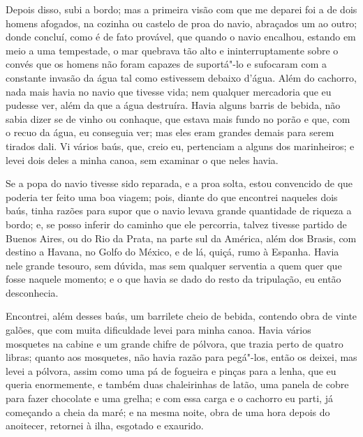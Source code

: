Depois disso, subi a bordo; mas a primeira visão com que me deparei foi
a de dois homens afogados, na cozinha ou castelo de proa do navio,
abraçados um ao outro; donde concluí, como é de fato provável, que
quando o navio encalhou, estando em meio a uma tempestade, o mar
quebrava tão alto e ininterruptamente sobre o convés que os homens não
foram capazes de suportá"-lo e sufocaram com a constante invasão da água
tal como estivessem debaixo d'água. Além do cachorro, nada mais havia no
navio que tivesse vida; nem qualquer mercadoria que eu pudesse ver, além
da que a água destruíra. Havia alguns barris de bebida, não sabia dizer
se de vinho ou conhaque, que estava mais fundo no porão e que, com o
recuo da água, eu conseguia ver; mas eles eram grandes demais para serem
tirados dali. Vi vários baús, que, creio eu, pertenciam a alguns dos
marinheiros; e levei dois deles a minha canoa, sem examinar o que neles
havia.

Se a popa do navio tivesse sido reparada, e a proa solta, estou
convencido de que poderia ter feito uma boa viagem; pois, diante do que
encontrei naqueles dois baús, tinha razões para supor que o navio levava
grande quantidade de riqueza a bordo; e, se posso inferir do caminho que
ele percorria, talvez tivesse partido de Buenos Aires, ou do Rio da
Prata, na parte sul da América, além dos Brasis, com destino a Havana,
no Golfo do México, e de lá, quiçá, rumo à Espanha. Havia nele grande
tesouro, sem dúvida, mas sem qualquer serventia a quem quer que fosse
naquele momento; e o que havia se dado do resto da tripulação, eu então
desconhecia.

Encontrei, além desses baús, um barrilete cheio de bebida, contendo obra
de vinte galões, que com muita dificuldade levei para minha canoa. Havia
vários mosquetes na cabine e um grande chifre de pólvora, que trazia
perto de quatro libras; quanto aos mosquetes, não havia razão para
pegá"-los, então os deixei, mas levei a pólvora, assim como uma pá de
fogueira e pinças para a lenha, que eu queria enormemente, e também duas
chaleirinhas de latão, uma panela de cobre para fazer chocolate e uma
grelha; e com essa carga e o cachorro eu parti, já começando a cheia da
maré; e na mesma noite, obra de uma hora depois do anoitecer, retornei à
ilha, esgotado e exaurido.


